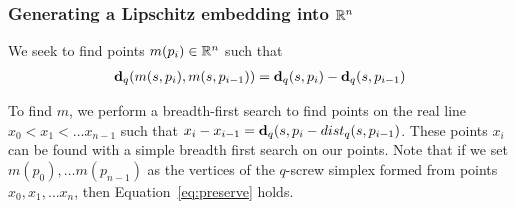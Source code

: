 \subsubsection{Generating a Lipschitz embedding into $\mathbb{R}^n$} %
\label{sec:lifting}
  
We seek to find points $m(p_i) \in \mathbb{R}^n$ such that 
\begin{align}\label{eq:preserve}
\mathbf{d}_q(m(s,p_i),m(s,p_{i-1})) = \mathbf{d}_q(s, p_i) - \mathbf{d}_q(s,p_{i-1} )
\end{align}

To find $m$, we perform a breadth-first search to find points on the real
line $x_0 < x_1 < \ldots x_{n-1}$ such that $x_i-x_{i-1} = \mathbf{d}_q(s, p_i
- dist_q(s, p_{i-1})$. These points $x_i$ can be found with a simple
  breadth first search on our points. Note that if we set $m(p_0), \ldots
m(p_{n-1})$ as the vertices of the $q$-screw simplex
formed from points $x_0, x_1, \ldots x_n$, then Equation~\ref{eq:preserve}
holds.


